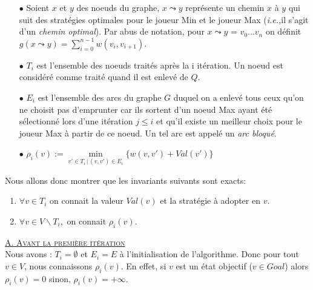 \begin{itemize}
	\item[$\bullet$] Soient $x$ et $y$ des noeuds du graphe, $x \leadsto y$ représente un chemin $x$ à $y$ qui suit des stratégies optimales pour le joueur Min et le joueur Max (\emph{i.e.,}il s'agit d'un \emph{chemin optimal}). Par abus de notation, pour $x \leadsto y$ = $v_0 ...v_n$ on définit $g(x \leadsto y) = \sum_{i=0}^{n-1} w(v_i, v_{i+1})$.
	\item[$\bullet$] $T_{i}$ est l'ensemble des noeuds traités après la i itération. Un noeud est considéré comme traité quand il est enlevé de $Q$.
	\item[$\bullet$] $E_i$ est l'ensemble des arcs du graphe $G$ duquel on a enlevé tous ceux qu'on ne choisit pas d'emprunter car ils sortent d'un noeud Max ayant été sélectionné lors d'une itération $j \leq i$ et qu'il existe un meilleur choix pour le joueur Max à partir de ce noeud. Un tel arc est appelé un \emph{arc bloqué}.
	\item[$\bullet$] $ \rho_i(v) := \underset{v' \in T_i\, |\,(v,v')\in E_i }{\min} \{ w(v,v') + Val(v') \} $ 
\end{itemize}

$\text{}$\\
\noindent Nous allons donc montrer que les invariants suivants sont exacts: 

\begin{enumerate}
	\item $\forall v \in T_i$ on connait la valeur $Val(v)$ et la stratégie à adopter en $v$.
	\item $\forall v \in V \backslash T_i,$ on connait $\rho_i(v)$.
\end{enumerate}
	
\noindent \underline{\textsc{A. Avant la première itération}}\\

Nous avons : $T_i = \emptyset$ et $E_i = E$ à l'initialisation de l'algorithme. Donc pour tout $v \in V$, nous connaissons $\rho_i(v)$. En effet, si $v$ est un état objectif ($v \in Goal$) alors $\rho_i(v) = 0$ sinon, $\rho_i(v) = + \infty$.\\

